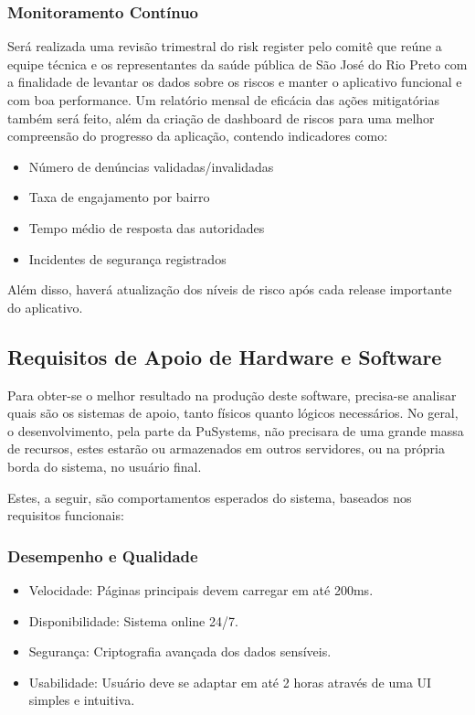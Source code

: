 \documentclass[a5paper, 12pt]{article}
\begin{document}
\subsubsection{Monitoramento Contínuo}
    Será realizada uma revisão trimestral do risk register pelo comitê que reúne a equipe técnica e os representantes da saúde pública de São José do Rio Preto com a finalidade de levantar os dados sobre os riscos e manter o aplicativo funcional e com boa performance. 
    Um relatório mensal de eficácia das ações mitigatórias também será feito, além da criação de dashboard de riscos para uma melhor compreensão do progresso da aplicação, contendo indicadores como: 
    \begin{itemize}
        \item Número de denúncias validadas/invalidadas
        \item Taxa de engajamento por bairro
        \item Tempo médio de resposta das autoridades
        \item Incidentes de segurança registrados
    \end{itemize}
    Além disso, haverá atualização dos níveis de risco após cada release importante do aplicativo.



\subsection{Requisitos de Apoio de Hardware e Software}

Para obter-se o melhor resultado na produção deste software, precisa-se analisar quais são os sistemas de apoio, tanto físicos quanto lógicos necessários. No geral, o desenvolvimento, pela parte da PuSystems, não precisara de uma grande massa de recursos, estes estarão ou armazenados em outros servidores, ou na própria borda do sistema, no usuário final. 

Estes, a seguir, são comportamentos esperados do sistema, baseados nos requisitos funcionais: 

\subsubsection{Desempenho e Qualidade}
\begin{itemize}[]
  \item Velocidade: Páginas principais devem carregar em até 200ms.
  \item Disponibilidade: Sistema online 24/7.
  \item Segurança: Criptografia avançada dos dados sensíveis.
  \item Usabilidade: Usuário deve se adaptar em até 2 horas através de uma UI simples e intuitiva.
\end{itemize}
\end{document}
